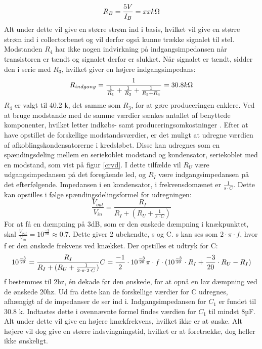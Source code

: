 \begin{equation}
R_B = \frac{5 V}{I_B} = xx k\ohm
\end{equation}
Alt under dette vil give en større strøm ind i basis, hvilket vil give en større strøm ind i collectorbenet og vil derfor også kunne trække signalet til stel.
Modstanden $R_4$ har ikke nogen indvirkning på indgangsimpedansen når transistoren er tændt og signalet derfor er slukket. Når signalet er tændt, sidder den i serie med $R_3$, hvilket giver en højere indgangsimpedans:
\begin{equation}
R_{indgang}=\frac{1}{\frac{1}{R_1}+\frac{1}{R_2}+\frac{1}{R_3+R_4}}=30.8 k\ohm
\end{equation}
$R_4$ er valgt til 40.2 k\ohm, det samme som $R_3$, for at gøre produceringen enklere. Ved at bruge modstande med de samme værdier sænkes antallet af benyttede komponenter, hvilket letter indkøbs- samt produceringsomkostninger .
Efter at have opstillet de forskellige modstandsværdier, er det muligt at udregne værdien af afkoblingskondensatorerne i kredsløbet. Disse kan udregnes som en spændingsdeling mellem en seriekoblet modstand og kondensator, seriekoblet med en modstand, som vist på figur \ref{crvd}. I dette tilfælde vil $R_U$ være udgangsimpedansen på det foregående led, og $R_I$ være indgangsimpedansen på det efterfølgende. Impedansen i en kondensator, i frekvensdomænet er $\frac{1}{s\cdot C}$. Dette kan opstilles i følge spændingsdelingsformel for udregningen:
\begin{equation}
\frac{V_{out}}{V_{in}}=\frac{R_I}{R_I+(R_U+\frac{1}{s\cdot C})}
\end{equation}
For at få en dæmpning på 3dB, som er den ønskede dæmpning i knækpunktet, skal $\frac{V_{out}}{V_{in}}=10^{\frac{-3}{20}}\approx0.7$. 
Dette giver 2 ubekendte, s og C. s kan ses som $2\cdot \pi \cdot f$, hvor f er den ønskede frekvens ved knækket. Der opstilles et udtryk for C:
\begin{equation}
10^{\frac{-3}{20}}=\frac{R_I}{R_I+(R_U+\frac{1}{2\cdot\pi\cdot 2\cdot C})}\\
C=\frac{-1}{2}\cdot{10^{\frac{-3}{20}}}{\pi\cdot f\cdot(10^{\frac{-3}{20}}\cdot R_I+\frac{-3}{20}}\cdot R_U - R_I)
\end{equation}
f bestemmes til 2hz, én dekade før den ønskede, for at opnå en lav dæmpning ved de ønskede 20hz. Ud fra dette kan de forskellige værdier for C udregnes, afhængigt af de impedanser de ser ind i.
Indgangsimpedansen for $C_1$ er fundet til 30.8 k\ohm . Indtastes dette i ovennævnte formel findes værdien for $C_1$ til mindst 8µF. Alt under dette vil give en højere knækfrekvens, hvilket ikke er at ønske. Alt højere vil dog give en større indsvingningstid, hvilket er at foretrække, dog heller ikke ønskeligt.